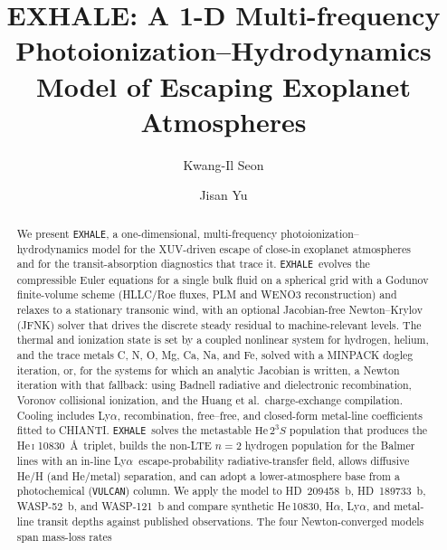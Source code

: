 \documentclass[twocolumn]{aastex702}
\newcommand{\EXHALE}{\texttt{EXHALE}}
\newcommand{\HeTS}{\mathrm{He}\,2^{3}S}
\newcommand{\Lya}{\mbox{Ly}\ensuremath{\alpha}}
\newcommand{\Ha}{\mbox{H}\ensuremath{\alpha}}
\begin{document}
\title{EXHALE: A 1-D Multi-frequency Photoionization--Hydrodynamics Model of
Escaping Exoplanet Atmospheres}

\author{Kwang-Il Seon}
\author{Jisan Yu}

\begin{abstract}
We present \EXHALE, a one-dimensional, multi-frequency photoionization--hydrodynamics
model for the XUV-driven escape of close-in exoplanet atmospheres and for the
transit-absorption diagnostics that trace it. \EXHALE\ evolves the compressible Euler
equations for a single bulk fluid on a spherical grid with a Godunov finite-volume
scheme (HLLC/Roe fluxes, PLM and WENO3 reconstruction) and relaxes to a stationary
transonic wind, with an optional Jacobian-free Newton--Krylov (JFNK) solver that drives
the discrete steady residual to machine-relevant levels. The thermal and ionization
state is set by a coupled nonlinear system for hydrogen, helium, and the trace metals
C, N, O, Mg, Ca, Na, and Fe, solved with a MINPACK dogleg iteration, or, for the
systems for which an analytic Jacobian is written, a Newton iteration with that
fallback: using Badnell radiative and dielectronic recombination, Voronov
collisional ionization, and the Huang et al.\ charge-exchange compilation. Cooling
includes \Lya, recombination, free--free, and closed-form metal-line coefficients fitted
to CHIANTI. \EXHALE\ solves the metastable $\HeTS$ population that produces the
\mbox{He\,\textsc{i}} 10830~\AA\ triplet, builds the non-LTE $n=2$ hydrogen population
for the Balmer lines with an in-line \Lya\ escape-probability radiative-transfer field,
allows diffusive He/H (and He/metal) separation, and can adopt a lower-atmosphere base
from a photochemical (\texttt{VULCAN}) column. We apply the model to HD~209458~b,
HD~189733~b, WASP-52~b, and WASP-121~b and compare synthetic \mbox{He\,10830}, \Ha,
\Lya, and metal-line transit depths against published observations. The four
Newton-converged models span mass-loss rates

\end{abstract}
\end{document}
